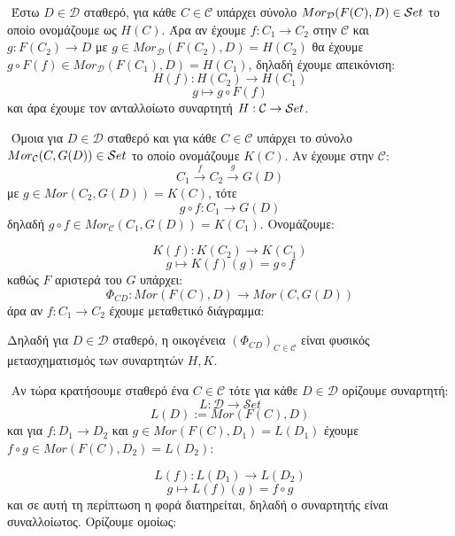 $ $\newline
Έστω $D \in \mathcal D$ σταθερό, για κάθε $C \in \mathcal C$ υπάρχει σύνολο $Mor_{\mathcal D}(F(C),D) \in \mathcal{S} et$ το οποίο ονομάζουμε ως $H(C)$. Άρα αν έχουμε $f:C_1\rightarrow C_2$ στην $\mathcal C$ και $g :F(C_2) \rightarrow D$ με $g \in Mor_{\mathcal D}(F(C_2),D) = H(C_2)$ θα έχουμε $g\circ F(f) \in Mor_{\mathcal D}(F(C_1),D) = H(C_1)$, δηλαδή έχουμε απεικόνιση:
$$H(f): H(C_2) \longrightarrow H(C_1)$$
$$g\longmapsto g\circ F(f)$$ και άρα έχουμε τον ανταλλοίωτο συναρτητή $H:\mathcal{C} \rightarrow \mathcal{S} et$.


$ $\newline
Όμοια για $D\in \mathcal D$ σταθερό και για κάθε $C \in \mathcal C$ υπάρχει το σύνολο $Mor_{\mathcal C}(C,G(D)) \in \mathcal{S} et$ το οποίο ονομάζουμε $K(C)$. Αν έχουμε στην $\mathcal{C}$:
$$C_1 \overset{f}{\longrightarrow }C_2 \overset{g}{\longrightarrow} G(D)$$ με $g \in Mor(C_2,G(D)) = K(C)$, τότε 
$$g\circ f :C_1 \longrightarrow G(D)$$ δηλαδή $g\circ f \in Mor_{\mathcal{C}}(C_1,G(D)) = K(C_1)$. Ονομάζουμε:

$$K(f):K(C_2)\longrightarrow K(C_1)$$
$$g\longmapsto K(f)(g) = g\circ f$$ καθώς $F$ αριστερά  του $G$ υπάρχει:
$$\Phi_{CD} : Mor(F(C),D) \longrightarrow Mor(C,G(D))$$ άρα αν $f:C_1\longrightarrow C_2$ έχουμε μεταθετικό διάγραμμα:

\begin{figure}[H]
    \centering
\end{figure}
\noindent Δηλαδή για $D \in \mathcal{D}$ σταθερό, η οικογένεια $(\Phi_{CD})_{C\in\mathcal{C}}$ είναι φυσικός μετασχηματισμός των συναρτητών $H,K$.

$ $\newline
Αν τώρα κρατήσουμε σταθερό ένα $C \in \mathcal{C}$ τότε για κάθε $D\in \mathcal{D}$ ορίζουμε συναρτητή:
$$L:\mathcal{D} \longrightarrow \mathcal{S} et$$
$$L(D):= Mor(F(C),D)$$ και για $f:D_1\rightarrow D_2$ και $g \in Mor(F(C),D_1) = L(D_1)$ έχουμε $f\circ g \in Mor(F(C),D_2) = L(D_2)$:

$$L(f): L(D_1) \longrightarrow L(D_2)$$
$$g\longmapsto L(f)(g) = f\circ g$$ και σε αυτή τη περίπτωση η φορά διατηρείται, δηλαδή ο συναρτητής είναι συναλλοίωτος. Ορίζουμε ομοίως:

